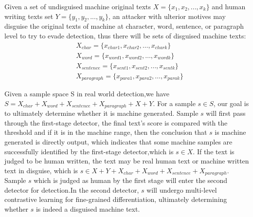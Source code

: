 \documentclass[11pt]{article}
\begin{document}
	Given a set of undisguised machine original texts $X=\{x_1,x_2,...,x_k\}$ and human writing texts set $Y=\{y_1,y_2,...,y_k\}$, an attacker with ulterior motives may disguise the original texts of machine at character, word, sentence, or paragraph level to try to evade detection, thus there will be sets of disguised machine texts:\\
  $$
\begin{aligned}
&X_{char} = \{x_{char1}, x_{char2}, \dots, x_{chark}\} \\
&X_{word} = \{x_{word1}, x_{word2}, \dots, x_{wordk}\} \\
&X_{sentence} = \{x_{sent1}, x_{sent2}, \dots, x_{sentk}\} \\
&X_{paragraph} = \{x_{para1}, x_{para2}, \dots, x_{parak}\}
\end{aligned}
$$

	Given a sample space S in real world detection,we have $S = X_{char} + X_{word} + X_{sentence} + X_{paragraph} + X + Y$. For a sample $s \in S$, our goal is to ultimately determine whether it is machine generated. Sample $s$ will first pass through the first-stage detector, the final text's score is compared with the threshold and if it is in the machine range, then the conclusion that $s$ is machine generated is directly output, which indicates that some machine samples are successfully identified by the first-stage detector,which is $s \in X$. If the text is judged to be human written, the text may be real human text or machine written text in disguise, which is $s \in X+Y+X_{char}+X_{word}+X_{sentence}+X_{paragraph}$. Sample $s$ which is judged as human by the first stage will enter the second detector for detection.In the second detector, $s$ will undergo multi-level contrastive learning for fine-grained differentiation, ultimately determining whether $s$ is indeed a disguised machine text.
	
	
\end{document}
